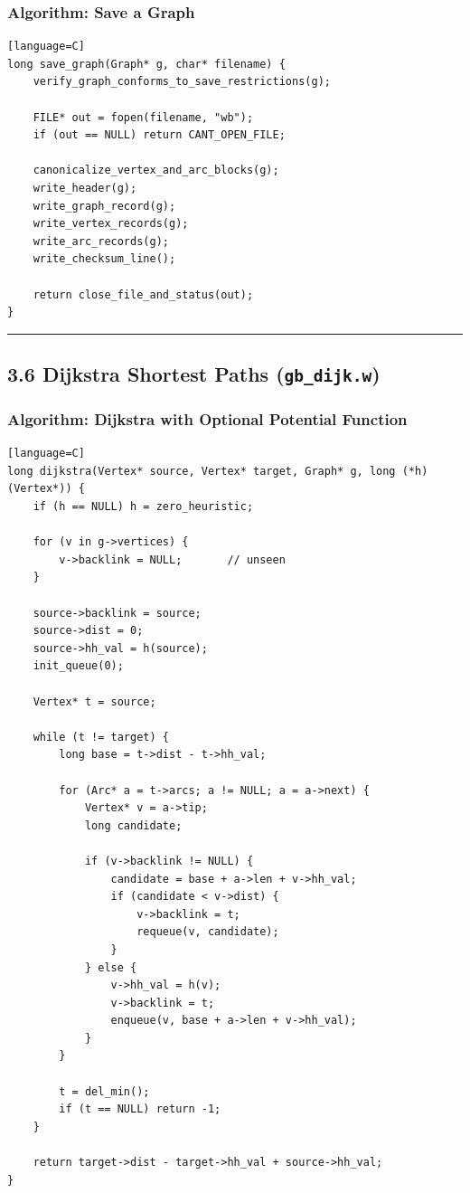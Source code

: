 \documentclass[11pt]{article}
\begin{document}
\subsubsection{Algorithm: Save a Graph}\label{algorithm-save-a-graph}

\begin{verbatim}[language=C]
long save_graph(Graph* g, char* filename) {
    verify_graph_conforms_to_save_restrictions(g);

    FILE* out = fopen(filename, "wb");
    if (out == NULL) return CANT_OPEN_FILE;

    canonicalize_vertex_and_arc_blocks(g);
    write_header(g);
    write_graph_record(g);
    write_vertex_records(g);
    write_arc_records(g);
    write_checksum_line();

    return close_file_and_status(out);
}
\end{verbatim}

\begin{center}\rule{0.5\linewidth}{0.5pt}\end{center}

\subsection{\texorpdfstring{3.6 Dijkstra Shortest Paths (\texttt{gb\_dijk.w})}{3.6 Dijkstra Shortest Paths (gb\_dijk.w)}}\label{dijkstra-shortest-paths-gb_dijk.w}

\subsubsection{Algorithm: Dijkstra with Optional Potential Function}\label{algorithm-dijkstra-with-optional-potential-function}

\begin{verbatim}[language=C]
long dijkstra(Vertex* source, Vertex* target, Graph* g, long (*h)(Vertex*)) {
    if (h == NULL) h = zero_heuristic;

    for (v in g->vertices) {
        v->backlink = NULL;       // unseen
    }

    source->backlink = source;
    source->dist = 0;
    source->hh_val = h(source);
    init_queue(0);

    Vertex* t = source;

    while (t != target) {
        long base = t->dist - t->hh_val;

        for (Arc* a = t->arcs; a != NULL; a = a->next) {
            Vertex* v = a->tip;
            long candidate;

            if (v->backlink != NULL) {
                candidate = base + a->len + v->hh_val;
                if (candidate < v->dist) {
                    v->backlink = t;
                    requeue(v, candidate);
                }
            } else {
                v->hh_val = h(v);
                v->backlink = t;
                enqueue(v, base + a->len + v->hh_val);
            }
        }

        t = del_min();
        if (t == NULL) return -1;
    }

    return target->dist - target->hh_val + source->hh_val;
}
\end{verbatim}
\end{document}
